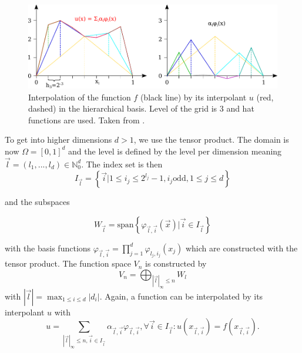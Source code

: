 \begin{figure}[H]
	\centering
	\includegraphics[width=\textwidth]{figures/Fig_2_7_hierarchical}
	\caption{ Interpolation of the function $ f $ (black line) by its interpolant $ u $ (red, dashed) in the hierarchical basis. Level of the grid is 3 and hat functions are used. Taken from \cite{pfluger2010spatially}.}
	\label{fig:weighted_sum_hierarchical}
\end{figure}

To get into higher dimensions $ d > 1 $, we use the tensor product. The domain is now $ \Omega = [0,1]^d $ and the level is defined by the level per dimension meaning $ \vec{l} = (l_1, ..., l_d) \in \mathbb{N}_0^d $. The index set is then
\begin{equation}
	I_{\vec{l}} = \left\{ \vec{i} | 1 \le i_j \le 2^{l_j} -1 , i_j \text{odd}, 1 \le j \le d \right\}
\end{equation}

and the subspaces 

\begin{equation}
	W_{\vec{l}} = \text{span}\left\{ \varphi_{\vec{l},\vec{i}}( \vec{x} ) | \vec{i} \in I_{\vec{l}}\right\}
\end{equation}

with the basis functions $ \varphi_{\vec{l},\vec{i}} = \prod_{j=1}^{d} \varphi_{l_j,i_j}(x_j) $ which are constructed with the tensor product. The function space $ V_n $ is constructed by
\begin{equation}
	V_n = \bigoplus_{\left|\vec{l}\right|_\infty \le n} W_l
\end{equation}
with $ \left|\vec{l}\right| = \max_{1 \le i \le d} \left|d_i\right| $. Again, a function can be interpolated by its interpolant $ u $ with
\begin{equation}
	u = \sum_{\left|\vec{l}\right|_\infty \le n, \vec{i} \in I_{\vec{l}}}\alpha_{\vec{l},\vec{i}} \varphi_{\vec{l},\vec{i}}, \forall \vec{i} \in I_{\vec{l}}: u\left(x_{\vec{l},\vec{i}}\right) = f\left(x_{\vec{l},\vec{i}}\right).
\end{equation}

